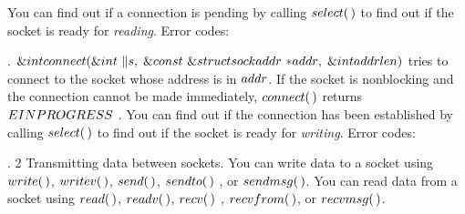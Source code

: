 You can find out if a connection is pending by calling \CD{}$\\{select}(\,)$%
\DC{} to find out if
the socket is ready for {\it reading}.
\medskip
Error codes:
\medskip{}

\fi

. \CD{}$\&{int}\ \\{connect}(\&{int}\ \|s,\;\&{const}\ \&{struct}\ %
\\{sockaddr}\ {*}\\{addr},\;\&{int}\ \\{addrlen})$\DC{} tries to connect to the
socket whose
address is in \CD{}$\\{addr}$\DC{}. If the socket is nonblocking and the
connection cannot be
made immediately, \CD{}$\\{connect}(\,)$\DC{} returns \CD{}$\\{EINPROGRESS}$%
\DC{}. You can find out if the
connection has been established by calling \CD{}$\\{select}(\,)$\DC{} to find
out if
the socket is ready for {\it writing}.
\medskip
Error codes:
\medskip{}

\fi

. 2 Transmitting data between sockets. You can write data to a socket using
\CD{}$\\{write}(\,)$\DC{},
\CD{}$\\{writev}(\,)$\DC{}, \CD{}$\\{send}(\,)$\DC{}, \CD{}$\\{sendto}(\,)$%
\DC{}, or \CD{}$\\{sendmsg}(\,)$\DC{}. You can read data from a socket
using \CD{}$\\{read}(\,)$\DC{}, \CD{}$\\{readv}(\,)$\DC{}, \CD{}$\\{recv}(\,)$%
\DC{}, \CD{}$\\{recvfrom}(\,)$\DC{}, or \CD{}$\\{recvmsg}(\,)$\DC{}.


